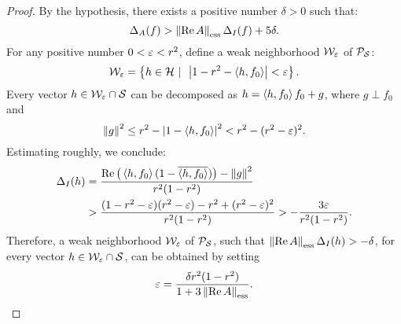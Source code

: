 \begin{proof}
By the hypothesis, there exists a positive number $\delta>0$
such that:
\begin{equation}\label{e:EC1}
  \Delta_A(f) > \essnorm{\RE{}A}\Delta_I(f) + 5\delta.
\end{equation}
For any positive number $0<\varepsilon<r^2$, define a weak
neighborhood ${\cal W}_\varepsilon$ of ${\cal P}_{{\cal S}}$:
\[ {\cal W}_\varepsilon = \left\{h\in{\cal H}\,\,|\,\,\,\left\vert1-r^2-\left<h,f_0\right>\right\vert < \varepsilon\right\}. \]
Every vector $h\in{\cal W}_\varepsilon\cap{\cal S}$ can be decomposed as
$h=\left<h,f_0\right>f_0+g$, where $g \perp f_0$ and
\[ \left\Vert g\right\Vert^2 \leq r^2 - \left\vert1-\left<h,f_0\right>\right\vert^2 < r^2 - (r^2 -\varepsilon)^2. \]
Estimating roughly, we conclude:
\begin{equation*}
\begin{split}
 \Delta_I(h) &=
  \frac{\operatorname{Re}\big(\left<h,f_0\right>(1-\overline{\left<h,f_0\right>})\big)
       -\left\Vert g\right\Vert^2}{r^2(1-r^2)}\\
&>\frac{(1-r^2-\varepsilon)(r^2-\varepsilon)-r^2+(r^2-\varepsilon)^2}{r^2(1-r^2)} >
  -\frac{3\varepsilon}{r^2(1-r^2)}.
\end{split}
\end{equation*}
Therefore, a weak neighborhood ${\cal W}_\varepsilon$ of ${\cal P}_{{\cal S}}$, such that
$\essnorm{\RE{}A} \Delta_I(h) > -\delta$, for every vector
$h\in{\cal W}_\varepsilon\cap{\cal S}$, can be obtained by setting
\[ \eps=\frac{\delta{}r^2(1-r^2)}{1+3\essnorm{\RE{}A}}. \]


\end{proof}
